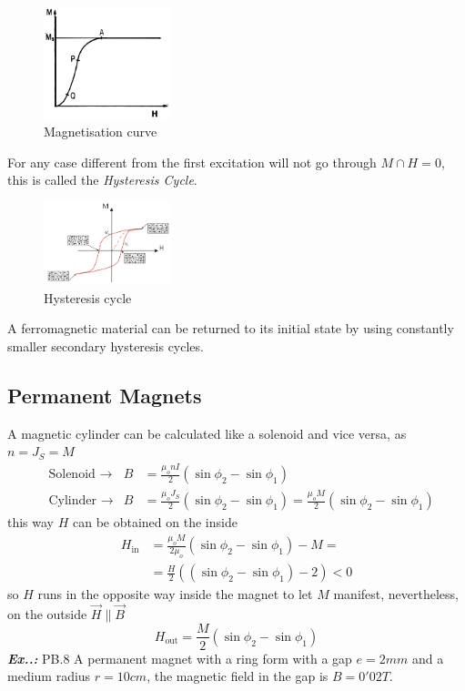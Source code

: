 \documentclass[a4paper]{article}
\begin{document}
\begin{figure}[H]
    \centering
    \includegraphics[width=0.33\textwidth]{IMG/mag_curve.png}
    \caption{Magnetisation curve}
    \label{fig:mag_curve}
\end{figure}

For any case different from the first excitation will not go through $M\cap H=0$, this is called the \textit{Hysteresis Cycle}.

\begin{figure}[H]
    \centering
    \includegraphics[width=0.33\textwidth]{IMG/hyst_cycle.png}
    \caption{Hysteresis cycle}
    \label{fig:hyst_cycle}
\end{figure}

A ferromagnetic material can be returned to its initial state by using constantly smaller secondary hysteresis cycles.

\subsection{Permanent Magnets}
\setcounter{equation}{0}
A magnetic cylinder can be calculated like a solenoid and vice versa, as $n=J_{S}=M$
\begin{align*}
&\text{Solenoid }\to & B&=\frac{\mu_{o}nI}{2}(\sin \phi_{2}-\sin \phi_{1}) \\
& \text{Cylinder }\to & B&=\frac{\mu _{o}J_{S}}{2}(\sin \phi_{2}-\sin \phi_{1})=\frac{\mu_{o}M}{2}(\sin \phi_{2}-\sin \phi_{1})
\end{align*}
this way $H$ can be obtained on the inside
\begin{align*}
H_{\text{in}}&=\frac{\mu_{o}M}{2\mu_{o}}(\sin \phi_{2}-\sin \phi_{1})-M= \\
&=\frac{H}{2}((\sin \phi_{2}-\sin \phi_{1})-2)<0
\end{align*}
so $H$ runs in the opposite way inside the magnet to let $M$ manifest, nevertheless, on the outside $\vec{H}\parallel \vec{B}$ 
$$
H_{\text{out}}=\frac{M}{2}(\sin \phi_{2}-\sin \phi_{1})
$$
\vspace{2ex}\textbf{\textit{Ex.\thesection.\theex: }}PB.8 A permanent magnet with a ring form with a gap $e=2mm$ and a medium radius $r=10cm$, the magnetic field in the gap is $B=0'02T$.
\end{document}
